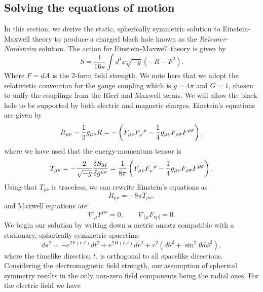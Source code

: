 \subsection{Solving the equations of motion}

In this section, we derive the static, spherically symmetric solution to Einstein-Maxwell theory to produce a charged black hole known as the \emph{Reissner-Nordstr\"om} solution. The action for Einstein-Maxwell theory is given by
\begin{equation}
\label{eq:EMaction}
	S = \frac{1}{16\pi} \int d^4x \sqrt{-g} (-R - F^2).
\end{equation}
Where $F = dA$ is the 2-form field strength. We note here that we adopt the relativistic convention for the gauge coupling which is $g = 4\pi$ and $G = 1$, chosen to unify the couplings from the Ricci and Maxwell terms. We will allow the black hole to be supported by both electric and magnetic charges. Einstein's equations are given by
\begin{equation*}
   R_{\mu \nu} - \half g_{\mu\nu} R = - \left( F_{\mu \rho} \tensor{F}{_\nu^{\rho}} - \frac{1}{4} g_{\mu \nu} F_{\rho \sigma} F^{\rho \sigma} \right),
\end{equation*}
where we have used that the energy-momentum tensor is
\begin{equation}
\label{eq:rnstressenergy}
   T_{\mu \nu} = -\frac{2}{\sqrt{-g}} \frac{ \delta S_{M}}{\delta g^{\mu \nu}} =  \frac{1}{8\pi} \left( F_{\mu \rho} \tensor{F}{_\nu^{\rho}} - \frac{1}{4} g_{\mu \nu} F_{\rho \sigma} F^{\rho \sigma} \right).
\end{equation}
Using that $T_{\mu \nu}$ is traceless, we can rewrite Einstein's equations as
\begin{equation}
\label{eq:rnee}
   R_{\mu \nu} = -8 \pi T_{\mu \nu},
\end{equation}
and Maxwell equations are 
\begin{equation*}
   \nabla_\mu F^{\mu \nu} = 0, \qquad \nabla_{[\mu} F_{\nu \rho]} = 0.
\end{equation*}
We begin our solution by writing down a metric ansatz compatible with a stationary, spherically symmetric spacetime
\begin{equation*}
   ds^2 = -e^{2F(r,t)} dt^2 + e^{2H(r,t)} dr^2 + r^2(d\theta^2 + \sin^2 \theta d\phi^2),
\end{equation*}
where the timelike direction $t$, is orthogonal to all spacelike directions. Considering the electromagnetic field strength, our assumption of spherical symmetry results in the only non-zero field components being the radial ones. For the electric field we have
